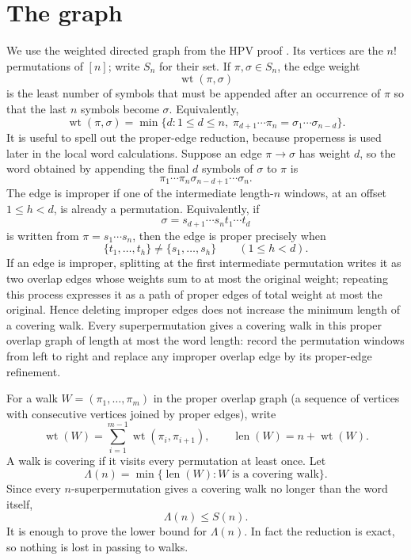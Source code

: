 \documentclass[11pt]{article}
\DeclareMathOperator{\wt}{wt}
\DeclareMathOperator{\len}{len}
\begin{document}
\section{The graph}

We use the weighted directed graph from the HPV proof \cite{HPV}.  Its vertices are the \(n!\) permutations of
\([n]\); write \(S_n\) for their set.  If \(\pi,\sigma\in S_n\), the edge weight
\[
  \wt(\pi,\sigma)
\]
is the least number of symbols that must be appended after an occurrence of \(\pi\) so that the last
\(n\) symbols become \(\sigma\).  Equivalently,
\[
  \wt(\pi,\sigma)=\min\{d:1\le d\le n,\;
    \pi_{d+1}\cdots \pi_n=\sigma_1\cdots\sigma_{n-d}\}.
\]
It is useful to spell out the proper-edge reduction, because properness is used later in the local
word calculations.  Suppose an edge \(\pi\to\sigma\) has weight \(d\), so the word obtained by
appending the final \(d\) symbols of \(\sigma\) to \(\pi\) is
\[
  \pi_1\cdots\pi_n\sigma_{n-d+1}\cdots\sigma_n .
\]
The edge is improper if one of the intermediate length-\(n\) windows, at an offset
\(1\le h<d\), is already a permutation.  Equivalently, if
\[
  \sigma=s_{d+1}\cdots s_n t_1\cdots t_d
\]
is written from \(\pi=s_1\cdots s_n\), then the edge is proper precisely when
\[
  \{t_1,\ldots,t_h\}\ne\{s_1,\ldots,s_h\}\qquad(1\le h<d). \tag{prop}
\]
If an edge is improper, splitting at the first intermediate permutation writes it as two overlap
edges whose weights sum to at most the original weight; repeating this process expresses it as a
path of proper edges of total weight at most the original.  Hence deleting improper edges does not
increase the minimum length of a covering walk.  Every superpermutation gives a covering walk in this proper overlap
graph of length at most the word length: record the permutation windows from left to right and
replace any improper overlap edge by its proper-edge refinement.

For a walk \(W=(\pi_1,\ldots,\pi_m)\) in the proper overlap graph (a sequence of vertices with
consecutive vertices joined by proper edges), write
\[
  \wt(W)=\sum_{i=1}^{m-1}\wt(\pi_i,\pi_{i+1}),\qquad
  \len(W)=n+\wt(W).
\]
A walk is covering if it visits every permutation at least once.  Let
\[
  \Lambda(n)=\min\{\len(W):W\text{ is a covering walk}\}.
\]
Since every \(n\)-superpermutation gives a covering walk no longer than the word itself,
\[
  \Lambda(n)\le S(n).
\]
It is enough to prove the lower bound for \(\Lambda(n)\).  In fact the reduction is exact,
so nothing is lost in passing to walks.
\end{document}
